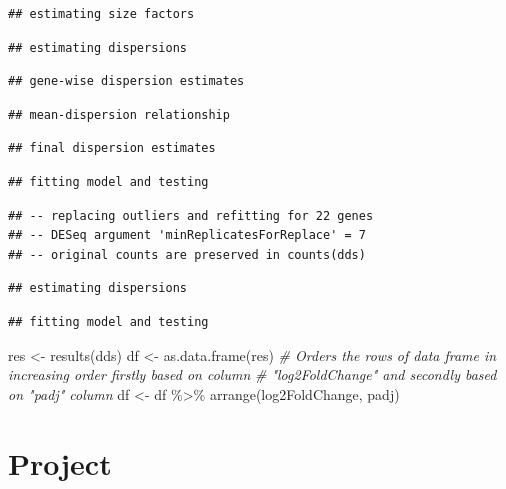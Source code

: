 \documentclass[
]{book}
\newenvironment{Shaded}{\begin{snugshade}}{\end{snugshade}}
\newcommand{\CommentTok}[1]{\textcolor[rgb]{0.56,0.35,0.01}{\textit{#1}}}
\newcommand{\FunctionTok}[1]{\textcolor[rgb]{0.00,0.00,0.00}{#1}}
\newcommand{\NormalTok}[1]{#1}
\newcommand{\OtherTok}[1]{\textcolor[rgb]{0.56,0.35,0.01}{#1}}
\newcommand{\SpecialCharTok}[1]{\textcolor[rgb]{0.00,0.00,0.00}{#1}}
\begin{document}
\begin{verbatim}
## estimating size factors
\end{verbatim}

\begin{verbatim}
## estimating dispersions
\end{verbatim}

\begin{verbatim}
## gene-wise dispersion estimates
\end{verbatim}

\begin{verbatim}
## mean-dispersion relationship
\end{verbatim}

\begin{verbatim}
## final dispersion estimates
\end{verbatim}

\begin{verbatim}
## fitting model and testing
\end{verbatim}

\begin{verbatim}
## -- replacing outliers and refitting for 22 genes
## -- DESeq argument 'minReplicatesForReplace' = 7 
## -- original counts are preserved in counts(dds)
\end{verbatim}

\begin{verbatim}
## estimating dispersions
\end{verbatim}

\begin{verbatim}
## fitting model and testing
\end{verbatim}

\begin{Shaded}
\begin{Highlighting}[]
\NormalTok{res }\OtherTok{\textless{}{-}} \FunctionTok{results}\NormalTok{(dds)}
\NormalTok{df }\OtherTok{\textless{}{-}} \FunctionTok{as.data.frame}\NormalTok{(res)}
\CommentTok{\# Orders the rows of data frame in increasing order firstly based on column}
\CommentTok{\# "log2FoldChange" and secondly based on "padj" column}
\NormalTok{df }\OtherTok{\textless{}{-}}\NormalTok{ df }\SpecialCharTok{\%\textgreater{}\%} \FunctionTok{arrange}\NormalTok{(log2FoldChange, padj)}
\end{Highlighting}
\end{Shaded}

\hypertarget{project}{%
\chapter{Project}\label{project}}
\end{document}
